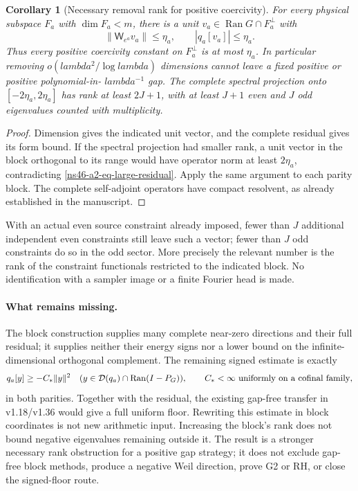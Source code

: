 \documentclass[11pt]{article}
\def\lambda{lambda}%
\newtheorem{corollary}[theorem]{Corollary}
\theoremstyle{remark}
\begin{document}
\begin{corollary}[Necessary removal rank for positive coercivity]
\label{ns46-a2-cor-rank}
For every physical subspace $F_a$ with $\dim F_a<m$, there is a
unit $v_a\in\operatorname{Ran}G\cap F_a^\perp$ with
\[
 \|\mathsf W_{e^a}v_a\|\le\eta_a,
 \qquad |q_a[v_a]|\le\eta_a.
\]
Thus every positive coercivity constant on $F_a^\perp$ is at most
$\eta_a$. In particular removing $o(\lambda^2/\log\lambda)$
dimensions cannot leave a fixed positive or positive polynomial-in-
$\lambda^{-1}$ gap. The complete spectral projection onto
$[-2\eta_a,2\eta_a]$ has rank at least $2J+1$, with at least
$J+1$ even and $J$ odd eigenvalues counted with multiplicity.
\end{corollary}
\begin{proof}
Dimension gives the indicated unit vector, and the complete residual
gives its form bound. If the spectral projection had smaller rank,
a unit vector in the block orthogonal to its range would have
operator norm at least $2\eta_a$, contradicting
\eqref{ns46-a2-eq-large-residual}. Apply the same argument to each
parity block. The complete self-adjoint operators have compact
resolvent, as already established in the manuscript.
\end{proof}
With an actual even source constraint already imposed, fewer than
$J$ additional independent even constraints still leave such a vector;
fewer than $J$ odd constraints do so in the odd sector. More precisely
the relevant number is the rank of the constraint functionals restricted
to the indicated block. No identification with a sampler image or a
finite Fourier head is made.

\paragraph{What remains missing.}
The block construction supplies many complete near-zero directions and
their full residual; it supplies neither their energy signs nor a lower
bound on the infinite-dimensional orthogonal complement. The remaining
signed estimate is exactly
\[
 q_a[y]\ge-C_*\|y\|^2\quad
 (y\in\mathcal D(q_a)\cap\operatorname{Ran}(I-P_G)),
 \qquad C_*<\infty\ \hbox{uniformly on a cofinal family},
\]
in both parities. Together with the residual, the existing gap-free
transfer in v1.18/v1.36 would give a full uniform floor. Rewriting this
estimate in block coordinates is not new arithmetic input. Increasing
the block's rank does not bound negative eigenvalues remaining outside
it. The result is a stronger necessary rank obstruction for a positive
gap strategy; it does not exclude gap-free block methods, produce a
negative Weil direction, prove G2 or RH, or close the signed-floor route.
\end{document}
